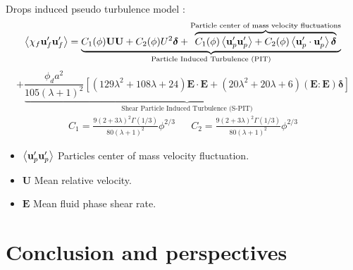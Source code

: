 \documentclass{sintefbeamer}
\begin{document}
\begin{frame}
    {
    Drops induced pseudo turbulence model : 
    }
    \small
    \begin{equation*}
      \left<\chi_f  \textbf{u}_f' \textbf{u}_f'\right>
      =
      \underbrace{
        C_1(\phi)\textbf{UU}
      + C_2(\phi)U^2 \bm\delta
      + \overbrace{C_1(\phi)\left<\textbf{u}_p'\textbf{u}_p'\right>
      + C_2(\phi)\left<\textbf{u}_{p}'\cdot \textbf{u}_{p}'\right>\bm\delta
      }^{\text{Particle center of mass velocity fluctuations}}
      }_\text{Particle Induced Turbulence (PIT)}
    \end{equation*}
    \begin{equation*}
      + \underbrace{\frac{\phi_d a^2 }{105 (\lambda +1)^2 }\left[
          (129\lambda^2+108\lambda+24)\textbf{E}\cdot \textbf{E}
          + (20\lambda^2 +20\lambda + 6)
          (\textbf{E} : \textbf{E})\bm\delta
      \right]}_\text{Shear Particle Induced Turbulence (S-PIT)}
  \end{equation*}
    \begin{align*}
      C_{1} = \frac{9(2+3\lambda)^2 \Gamma(1/3)}{80 (\lambda +1)^2}\phi^{2/3} 
      &&
      C_2 = \frac{9(2+3\lambda)^2 \Gamma(1/3)}{80 (\lambda +1)^2}\phi^{2/3} 
    \end{align*}
    \begin{itemize}
      \item $\left<\textbf{u}_p'\textbf{u}_p'\right>$ Particles center of mass velocity fluctuation.  
      \item $\textbf{U}$ Mean relative velocity. 
      \item $\textbf{E}$ Mean fluid phase shear rate. 
    \end{itemize}
\end{frame}

\section{Conclusion and perspectives}
\end{document}
